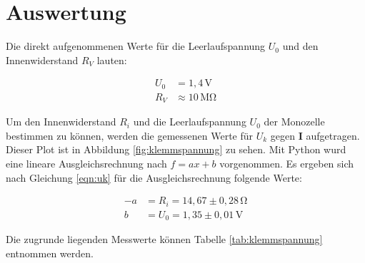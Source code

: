 \section{Auswertung}
\label{sec:Auswertung}

Die direkt aufgenommenen Werte für die Leerlaufspannung $U_0$ und den Innenwiderstand $R_V$ lauten:

\begin{align*}
  U_0 &= 1,4 \, \si{\volt} \\
  R_V &\approx 10 \, \si{\mega\ohm}
\end{align*}

\noindent Um den Innenwiderstand $R_i$ und die Leerlaufspannung $U_0$ der Monozelle bestimmen zu können, werden die gemessenen Werte für $U_k$ gegen \textbf{I} aufgetragen.
Dieser Plot ist in Abbildung \ref{fig:klemmspannung} zu sehen.
Mit Python wurd eine lineare Ausgleichsrechnung nach $f = ax + b$ vorgenommen.
Es ergeben sich nach Gleichung \eqref{eqn:uk} für die Ausgleichsrechnung folgende Werte:

\begin{align*}
  -a &= R_i = 14,67 \pm 0,28 \, \si{\ohm} \\
  b &= U_0 = 1,35 \pm 0,01 \, \si{\volt}
\end{align*}

\noindent Die zugrunde liegenden Messwerte können Tabelle \ref{tab:klemmspannung} entnommen werden.

